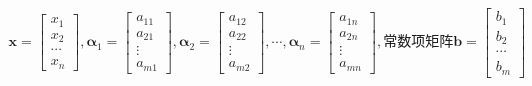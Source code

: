 \documentclass[12pt]{book}
\begin{document}
\begin{gather*}
    \mathbf{x} = \begin{bmatrix}
        x_1\\x_2\\\cdots\\x_n
    \end{bmatrix}, 
    \bm{\alpha}_1 = \begin{bmatrix}
        a_{11}\\a_{21}\\\vdots\\a_{m1}
    \end{bmatrix},
    \bm{\alpha}_2 = \begin{bmatrix}
        a_{12}\\a_{22}\\\vdots\\a_{m2}
    \end{bmatrix},\cdots,
    \bm{\alpha}_n = \begin{bmatrix}
        a_{1n}\\a_{2n}\\\vdots\\a_{mn}
    \end{bmatrix}
    ,\text{常数项矩阵}
    \mathbf{b} = \begin{bmatrix}
        b_1 \\ b_2 \\ \cdots \\ b_m
    \end{bmatrix}
\end{gather*}
\end{document}
